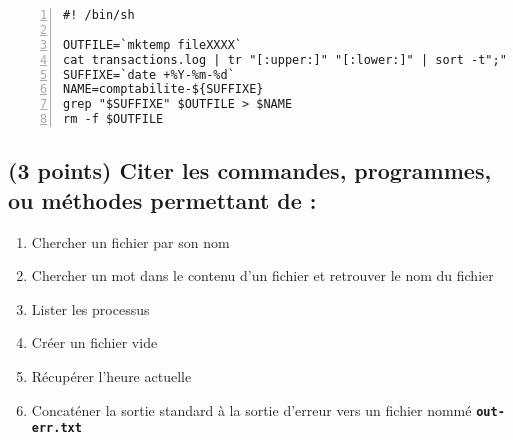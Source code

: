 \documentclass[11pt,a4paper]{article}
\newcommand{\TTBF}[1]{\texttt{\textbf{#1}}}
\begin{document}
\bigskip

\lstset{language=sh}
\begin{lstlisting}[frame=single,numbers=left,title={script.sh}]
#! /bin/sh

OUTFILE=`mktemp fileXXXX`
cat transactions.log | tr "[:upper:]" "[:lower:]" | sort -t";" -k1 -o $OUTFILE
SUFFIXE=`date +%Y-%m-%d`
NAME=comptabilite-${SUFFIXE}
grep "$SUFFIXE" $OUTFILE > $NAME
rm -f $OUTFILE

\end{lstlisting}

\bigskip

\subsection{(3 points) Citer les commandes, programmes, ou méthodes permettant de :}

\begin{enumerate}[label=\Alph*]
\item Chercher un fichier par son nom
\item Chercher un mot dans le contenu d'un fichier et retrouver le nom du fichier
\item Lister les processus
\item Créer un fichier vide
\item Récupérer l'heure actuelle
\item Concaténer la sortie standard à la sortie d'erreur vers un fichier nommé \TTBF{out-err.txt}
\end{enumerate}
\end{document}
